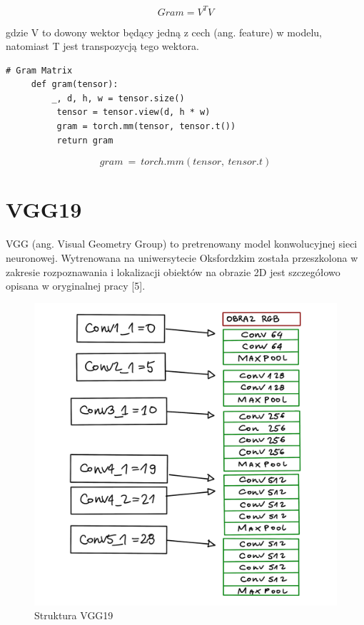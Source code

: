 \documentclass[brudnopis]{xmgr}
\begin{document}
\begin{equation}
Gram = V^TV
\end{equation}

gdzie V to dowony wektor będący jedną z cech (ang. feature) w modelu, natomiast T jest transpozycją tego wektora. 
\begin{lstlisting}
# Gram Matrix
	 def gram(tensor):
	 	 _, d, h, w = tensor.size()
          tensor = tensor.view(d, h * w)
          gram = torch.mm(tensor, tensor.t())
          return gram
\end{lstlisting}


\begin{equation}
gram\:=\:torch.mm (tensor,\:tensor.t)
\end{equation}

\section{VGG19\label{s:dsssl}}

VGG (ang. Visual Geometry Group) to pretrenowany model konwolucyjnej sieci neuronowej. 
Wytrenowana na uniwersytecie Oksfordzkim została przeszkolona w zakresie rozpoznawania i lokalizacji obiektów na obrazie 2D jest szczegółowo opisana w oryginalnej pracy [5].

\begin{figure}[!tbh]
\centering
\includegraphics[width=.8\hsize]{fig/7}
\caption{Struktura VGG19\label{RYS.4}}
\end{figure}
\end{document}
